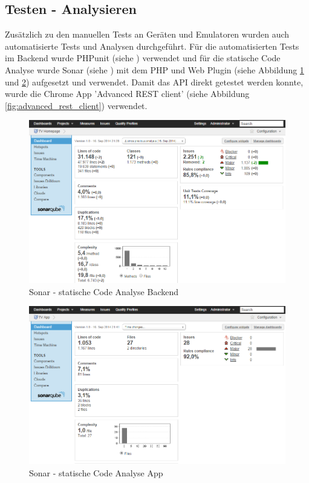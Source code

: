 \newpage
\subsection{Testen - Analysieren}
Zusätzlich zu den manuellen Tests an Geräten und  Emulatoren wurden auch automatisierte Tests und Analysen durchgeführt. Für die automatisierten Tests im Backend wurde PHPunit (siehe \cite{phpunit}) verwendet und für die statische Code Analyse wurde Sonar (siehe \cite{sonar}) mit dem PHP und Web Plugin (siehe Abbildung \ref{fig:sonar_backend} und \ref{fig:sonar_app}) aufgesetzt und verwendet. Damit das API direkt getestet werden konnte, wurde die Chrome App 'Advanced REST client' (siehe Abbildung \ref{fig:advanced_rest_client}) verwendet.

\begin{figure}[h]
\centering
\includegraphics[scale=0.5]{images/sonar_backend.png}
\caption{Sonar - statische Code Analyse Backend}
\label{fig:sonar_backend}
\end{figure}

\begin{figure}[h]
\centering
\includegraphics[scale=0.5]{images/sonar_app.png}
\caption{Sonar - statische Code Analyse App}
\label{fig:sonar_app}
\end{figure}

